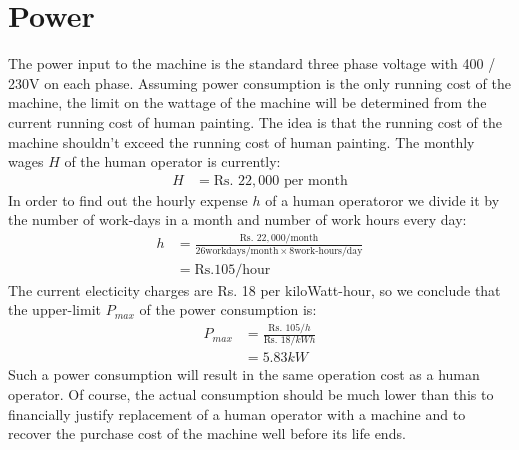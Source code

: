 \documentclass[a4paper,10pt]{article}
\newcommand{\cfbox}[2]{%
    \colorlet{currentcolor}{.}%
    {\color{#1}%
    \fbox{\color{currentcolor}#2}}%
}
\begin{document}
\section{Power}
The power input to the machine is the standard three phase voltage with 400 / 230V on each phase.
Assuming power consumption is the only running cost of the machine, the limit on the wattage of the machine
will be determined from the current running cost of human painting. The idea is that the running cost of the 
machine shouldn't exceed the running cost of human painting. The monthly wages $H$ of the human operator is currently:
\begin{align}
 H &= \text{Rs. }22,000 \text{ per month} 
\end{align}
In order to find out the hourly expense $h$ of a human operatoror we divide it by the number of work-days in 
a month and number of work hours every day:
\begin{align}
 h &= \frac{\text{Rs. }22,000\text{/month}}{26 \text{workdays/month} \times 8 \text{work-hours/day}} \nonumber \\
 &= \text{Rs.} 105 \text{/hour}
\end{align}
The current electicity charges are Rs. 18 per kiloWatt-hour, so we conclude that the upper-limit $P_{max}$ of the 
power consumption is:
\begin{align}
 P_{max} &= \frac{\text{Rs. }105/h}{\text{Rs. }18/kWh} \nonumber \\
 &=5.83 kW
\end{align}
Such a power consumption will result in the same operation cost as a human operator. 
Of course, the actual consumption should be much lower than this to financially justify replacement of a human
operator with a machine and to recover the purchase cost of the machine well before its life ends.

% 
\end{document}
